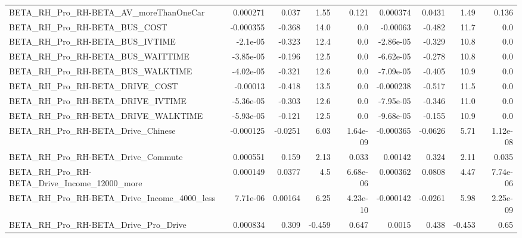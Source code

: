 \begin{tabular}{lrrrrrrrr}
BETA\_RH\_Pro\_RH-BETA\_AV\_moreThanOneCar              &    0.000271 &        0.037 &      1.55 &    0.121 &   0.000374 &      0.0431 &         1.49 &         0.136 \\
BETA\_RH\_Pro\_RH-BETA\_BUS\_COST                       &   -0.000355 &       -0.368 &      14.0 &      0.0 &   -0.00063 &      -0.482 &         11.7 &           0.0 \\
BETA\_RH\_Pro\_RH-BETA\_BUS\_IVTIME                     &    -2.1e-05 &       -0.323 &      12.4 &      0.0 &  -2.86e-05 &      -0.329 &         10.8 &           0.0 \\
BETA\_RH\_Pro\_RH-BETA\_BUS\_WAITTIME                   &   -3.85e-05 &       -0.196 &      12.5 &      0.0 &  -6.62e-05 &      -0.278 &         10.8 &           0.0 \\
BETA\_RH\_Pro\_RH-BETA\_BUS\_WALKTIME                   &   -4.02e-05 &       -0.321 &      12.6 &      0.0 &  -7.09e-05 &      -0.405 &         10.9 &           0.0 \\
BETA\_RH\_Pro\_RH-BETA\_DRIVE\_COST                     &    -0.00013 &       -0.418 &      13.5 &      0.0 &  -0.000238 &      -0.517 &         11.5 &           0.0 \\
BETA\_RH\_Pro\_RH-BETA\_DRIVE\_IVTIME                   &   -5.36e-05 &       -0.303 &      12.6 &      0.0 &  -7.95e-05 &      -0.346 &         11.0 &           0.0 \\
BETA\_RH\_Pro\_RH-BETA\_DRIVE\_WALKTIME                 &   -5.93e-05 &       -0.121 &      12.5 &      0.0 &  -9.68e-05 &      -0.155 &         10.9 &           0.0 \\
BETA\_RH\_Pro\_RH-BETA\_Drive\_Chinese                  &   -0.000125 &      -0.0251 &      6.03 & 1.64e-09 &  -0.000365 &     -0.0626 &         5.71 &      1.12e-08 \\
BETA\_RH\_Pro\_RH-BETA\_Drive\_Commute                  &    0.000551 &        0.159 &      2.13 &    0.033 &    0.00142 &       0.324 &         2.11 &         0.035 \\
BETA\_RH\_Pro\_RH-BETA\_Drive\_Income\_12000\_more        &    0.000149 &       0.0377 &       4.5 & 6.68e-06 &   0.000362 &      0.0808 &         4.47 &      7.74e-06 \\
BETA\_RH\_Pro\_RH-BETA\_Drive\_Income\_4000\_less         &    7.71e-06 &      0.00164 &      6.25 & 4.23e-10 &  -0.000142 &     -0.0261 &         5.98 &      2.25e-09 \\
BETA\_RH\_Pro\_RH-BETA\_Drive\_Pro\_Drive                &    0.000834 &        0.309 &    -0.459 &    0.647 &     0.0015 &       0.438 &       -0.453 &          0.65 \\

\end{tabular}
